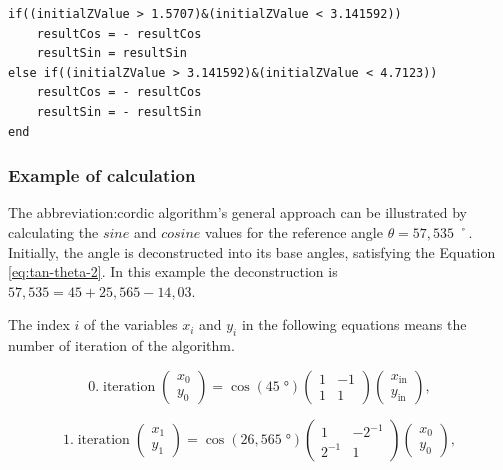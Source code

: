 \documentclass[a4paper, twoside, 11pt]{article}
\begin{document}
\begin{lstlisting}[language={pseudocode}, caption={Pseudocode for if statements used at the final $sinus$ and $cosinus$ value calculation.}, label= {lst:cordic-ending-if-statements}]
if((initialZValue > 1.5707)&(initialZValue < 3.141592))
    resultCos = - resultCos
    resultSin = resultSin
else if((initialZValue > 3.141592)&(initialZValue < 4.7123))
    resultCos = - resultCos
    resultSin = - resultSin
end
\end{lstlisting}

        \subsubsection{Example of calculation}\label{subsubsec:example-of-calculation}
            The \gls{abbreviation:cordic} algorithm's general approach can be illustrated by calculating the $sine$ and $cosine$ values for the reference angle $\theta = 57,535\;˚$. Initially, the angle is deconstructed into its base angles, satisfying the Equation \ref{eq:tan-theta-2}. In this example the deconstruction is $57,535 = 45 + 25,565 -14,03$.\par
            The index $i$ of the variables $x_i$ and $y_i$ in the following equations means the number of iteration of the algorithm.

            \begin{equation}
                0.\;\text{iteration}\;
                \begin{pmatrix}
                    x_0\\y_0
                \end{pmatrix}
                =
                \cos (45\;°)
                \begin{pmatrix}
                    1 & -1\\
                    1 & 1
                \end{pmatrix}
                \begin{pmatrix}
                    x_\text{in}\\
                    y_\text{in}
                \end{pmatrix},
            \end{equation}

            
            \begin{equation}
                1.\;\text{iteration}\;
                \begin{pmatrix}
                    x_1\\y_1
                \end{pmatrix}
                =
                \cos (26,565\;°)
                \begin{pmatrix}
                    1 & -2^{-1}\\
                    2^{-1} & 1
                \end{pmatrix}
                \begin{pmatrix}
                    x_0\\
                    y_0
                \end{pmatrix},
            \end{equation}
\end{document}
